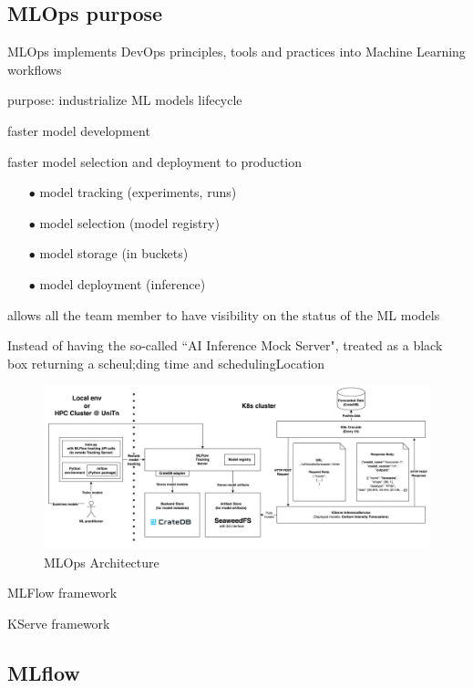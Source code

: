 \subsection{MLOps purpose}

MLOps implements DevOps principles, tools and practices into Machine Learning workflows 


purpose: industrialize ML models lifecycle

faster model development

faster model selection and deployment to production

\begin{itemize}[itemsep=0.2pt, topsep=1pt]
  \item[$\bullet$] model tracking (experiments, runs)
  \item[$\bullet$] model selection (model registry)
  \item[$\bullet$] model storage (in buckets)
  \item[$\bullet$] model deployment (inference)
\end{itemize}


allows all the team member to have visibility on the status of the ML models

Instead of having the so-called ``AI Inference Mock Server", treated as a black box returning a scheul;ding time and schedulingLocation

\begin{figure}[htb]
\centering
\includegraphics[width=1\linewidth]{images/mlops_workflow.png}
\caption{MLOps Architecture}
\label{fig:mlops}
\end{figure}


MLFlow framework

KServe framework


\subsection{MLflow}



